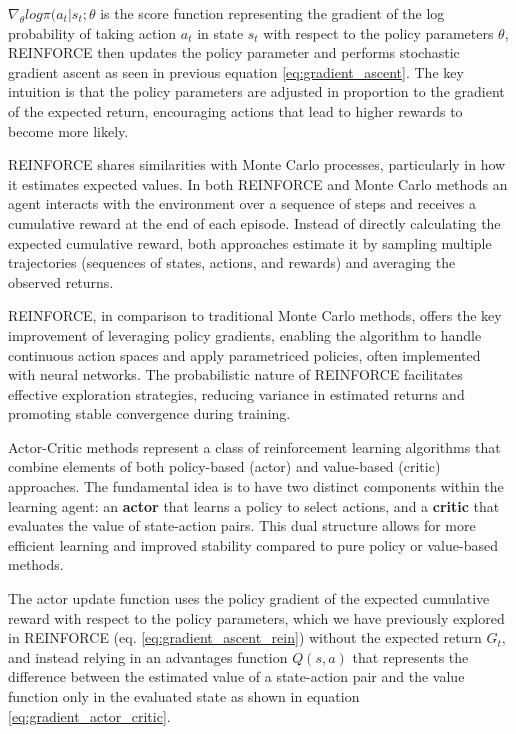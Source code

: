 $\nabla_\theta log \pi(a_t|s_t;\theta$ is the score function representing the gradient of the log probability of taking action $a_t$ in state $s_t$ with respect to the policy parameters $\theta$, REINFORCE then updates the policy parameter and performs stochastic gradient ascent as seen in previous equation \ref{eq:gradient_ascent}. The key intuition is that the policy parameters are adjusted in proportion to the gradient of the expected return, encouraging actions that lead to higher rewards to become more likely.

REINFORCE shares similarities with Monte Carlo processes, particularly in how it estimates expected values. In both REINFORCE and Monte Carlo methods an agent interacts with the environment over a sequence of steps and receives a cumulative reward at the end of each episode. Instead of directly calculating the expected cumulative reward, both approaches estimate it by sampling multiple trajectories (sequences of states, actions, and rewards) and averaging the observed returns.

REINFORCE, in comparison to traditional Monte Carlo methods, offers the key improvement of leveraging policy gradients, enabling the algorithm to handle continuous action spaces and apply parametriced policies, often implemented with neural networks. The probabilistic nature of REINFORCE facilitates effective exploration strategies, reducing variance in estimated returns and promoting stable convergence during training.

Actor-Critic methods represent a class of reinforcement learning algorithms that combine elements of both policy-based (actor) and value-based (critic) approaches. The fundamental idea is to have two distinct components within the learning agent: an \textbf{actor} that learns a policy to select actions, and a \textbf{critic} that evaluates the value of state-action pairs. This dual structure allows for more efficient learning and improved stability compared to pure policy or value-based methods.

The actor update function uses the policy gradient of the expected cumulative reward with respect to the policy parameters, which we have previously explored in REINFORCE (eq. \ref{eq:gradient_ascent_rein}) without the expected return $G_t$, and instead relying in an advantages function $Q(s,a)$ that represents the difference between the estimated value of a state-action pair and the value function only in the evaluated state as shown in equation \ref{eq:gradient_actor_critic}. 

